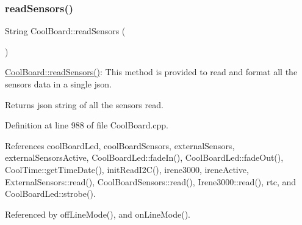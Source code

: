 \subsubsection{\texorpdfstring{read\+Sensors()}{readSensors()}}
{\footnotesize\ttfamily String Cool\+Board\+::read\+Sensors (\begin{DoxyParamCaption}{ }\end{DoxyParamCaption})}

\hyperlink{classCoolBoard_ad03abdce2e65f520bbf2cff0f2d083cf}{Cool\+Board\+::read\+Sensors()}\+: This method is provided to read and format all the sensors data in a single json.

\begin{DoxyReturn}{Returns}
json string of all the sensors read. 
\end{DoxyReturn}


Definition at line 988 of file Cool\+Board.\+cpp.



References cool\+Board\+Led, cool\+Board\+Sensors, external\+Sensors, external\+Sensors\+Active, Cool\+Board\+Led\+::fade\+In(), Cool\+Board\+Led\+::fade\+Out(), Cool\+Time\+::get\+Time\+Date(), init\+Read\+I2\+C(), irene3000, irene\+Active, External\+Sensors\+::read(), Cool\+Board\+Sensors\+::read(), Irene3000\+::read(), rtc, and Cool\+Board\+Led\+::strobe().



Referenced by off\+Line\+Mode(), and on\+Line\+Mode().


